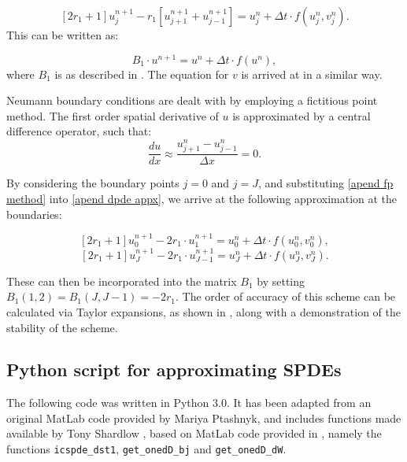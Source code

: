 \documentclass[12pt]{article}
\begin{document}
\begin{equation}\label{apend dpde appx}
    \left[2r_1 + 1\right]u_j^{n+1} - r_1\left[u_{j+1}^{n+1} + u_{j-1}^{n+1} \right]  = u_j^n + \Delta t \cdot f(u_j^n, v_j^n).
\end{equation}
This can be written as:

\begin{equation*}
    B_1\cdot u^{n+1} = u^n + \Delta t \cdot f(u^n),
\end{equation*}
where $B_1$ is as described in . The equation for $v$ is arrived at in a similar way.

Neumann boundary conditions are dealt with by employing a fictitious point method. The first order spatial derivative of $u$  is approximated by a central difference operator, such that:
\begin{equation} \label{apend fp method}
    \frac{du}{dx} \approx \frac{u_{j+1}^n - u_{j-1}^n}{\Delta x} = 0.
\end{equation}

By considering the boundary points $j = 0$ and $j = J$, and substituting \eqref{apend fp method} into \eqref{apend dpde appx}, we arrive at the following approximation at the boundaries:

\begin{equation}
    \left[2r_1 + 1\right]u_0^{n+1} - 2r_1\cdot u_1^{n+1}  = u_0^n + \Delta t \cdot f(u_0^n, v_0^n),
\end{equation}
\begin{equation}
        \left[2r_1 + 1\right]u_J^{n+1} - 2r_1\cdot u_{J-1}^{n+1}  = u_J^n + \Delta t \cdot f(u_J^n, v_J^n).
\end{equation}

These can then be incorporated into the matrix $B_1$ by setting $B_1(1,2) = B_1(J, J-1) = -2r_1$. The order of accuracy of this scheme can be calculated via Taylor expansions, as shown in \cite{Iserles}, along with a demonstration of the stability of the scheme. 
\subsection{Python script for approximating SPDEs}
The following code was written in Python 3.0. It has been adapted from an original MatLab code provided by Mariya Ptashnyk, and includes functions made available by Tony Shardlow \cite{Shardlow}, based on MatLab code provided in \cite{Lord}, namely the functions \texttt{icspde\_dst1}, \texttt{get\_onedD\_bj} and \texttt{get\_onedD\_dW}.



\clearpage
\end{document}
